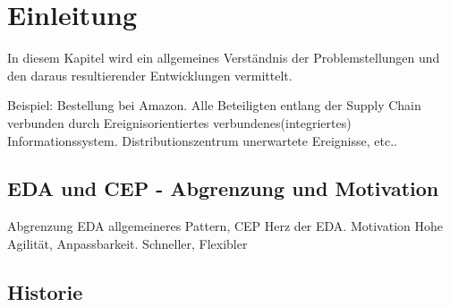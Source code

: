 \chapter{Einleitung}

In diesem Kapitel wird ein allgemeines Verständnis der Problemstellungen und den daraus resultierender Entwicklungen vermittelt.

Beispiel: Bestellung bei Amazon. Alle Beteiligten entlang der Supply Chain verbunden durch Ereignisorientiertes verbundenes(integriertes) Informationssystem. Distributionszentrum unerwartete Ereignisse, etc..


\section{EDA und CEP - Abgrenzung und Motivation}

Abgrenzung EDA allgemeineres Pattern, CEP Herz der EDA.
Motivation Hohe Agilität, Anpassbarkeit. Schneller, Flexibler


\section{Historie}